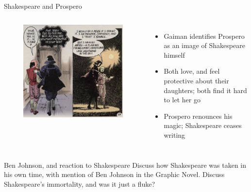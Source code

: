 \documentclass{beamer}
\begin{document}
\begin{frame}{Shakespeare and Prospero}
\begin{columns}[c]
      \begin{figure}[htp]
        \begin{center}
          \centering
          \includegraphics[scale=0.32]{prospere.jpg}
        \end{center}
      \end{figure}
      

      \begin{itemize}
      \item Gaiman identifies Prospero as an image of Shakespeare himself
      \item Both love, and feel protective about their daughters; both find it hard to let her go
      \item Prospero renounces his magic; Shakespeare ceases writing
      \end{itemize}
    \end{columns}
  \end{frame}
  
  \begin{frame}{Ben Johnson, and reaction to Shakespeare}
    Discuss how Shakespeare was taken in his own time, with mention of Ben Johnson in the Graphic Novel. Discuss Shakespeare's immortality, and was it just a fluke?    
  \end{frame}
  
\end{document}
